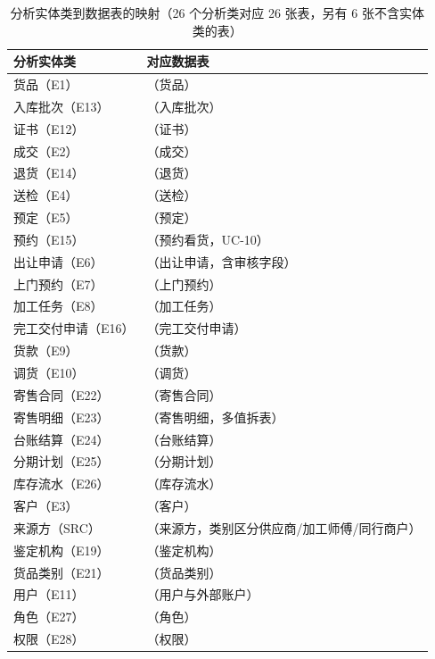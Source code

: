 \begin{table}[H]
\centering
\small
\caption{分析实体类到数据表的映射（26 个分析类对应 26 张表，另有 6 张不含实体类的表）}
\label{tab:class-table}
\begin{tabularx}{\textwidth}{@{}l Y@{}}
\toprule
分析实体类 & 对应数据表 \\
\midrule
货品（E1） & （货品） \\
入库批次（E13） & （入库批次） \\
证书（E12） & （证书） \\
成交（E2） & （成交） \\
退货（E14） & （退货） \\
送检（E4） & （送检） \\
预定（E5） & （预定） \\
预约（E15） & （预约看货，UC-10） \\
出让申请（E6） & （出让申请，含审核字段） \\
上门预约（E7） & （上门预约） \\
加工任务（E8） & （加工任务） \\
完工交付申请（E16） & （完工交付申请） \\
货款（E9） & （货款） \\
调货（E10） & （调货） \\
寄售合同（E22） & （寄售合同） \\
寄售明细（E23） & （寄售明细，多值拆表） \\
台账结算（E24） & （台账结算） \\
分期计划（E25） & （分期计划） \\
库存流水（E26） & （库存流水） \\
客户（E3） & （客户） \\
来源方（SRC） & （来源方，类别区分供应商/加工师傅/同行商户） \\
鉴定机构（E19） & （鉴定机构） \\
货品类别（E21） & （货品类别） \\
用户（E11） & （用户与外部账户） \\
角色（E27） & （角色） \\
权限（E28） & （权限） \\
\bottomrule
\end{tabularx}
\end{table}

